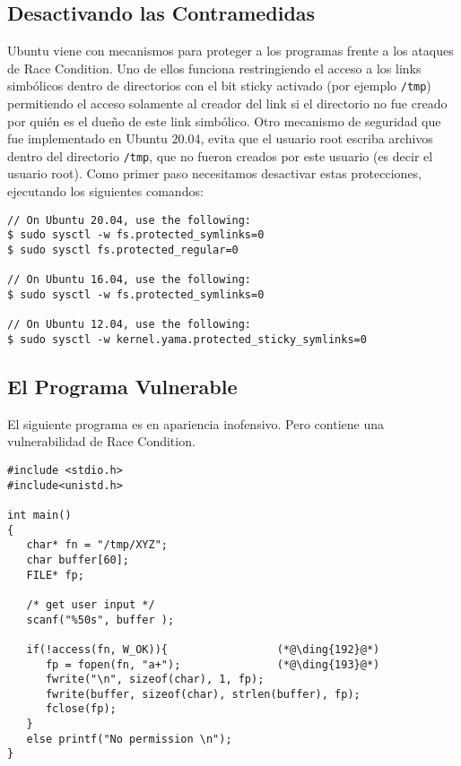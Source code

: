 \subsection{Desactivando las Contramedidas}

Ubuntu viene con mecanismos para proteger a los programas frente a los ataques de Race Condition. Uno de ellos funciona restringiendo el acceso a los links simbólicos dentro de  directorios con el bit sticky activado (por ejemplo {\tt /tmp}) permitiendo el acceso solamente al creador del link si el directorio no fue creado por quién es el dueño de este link simbólico.
Otro mecanismo de seguridad que fue implementado en Ubuntu 20.04, evita que el usuario root escriba archivos dentro del directorio \texttt{/tmp}, que no fueron creados por este usuario (es decir el usuario root).
Como primer paso necesitamos desactivar estas protecciones, ejecutando los siguientes comandos:

\begin{lstlisting}
// On Ubuntu 20.04, use the following:
$ sudo sysctl -w fs.protected_symlinks=0
$ sudo sysctl fs.protected_regular=0

// On Ubuntu 16.04, use the following:
$ sudo sysctl -w fs.protected_symlinks=0

// On Ubuntu 12.04, use the following:
$ sudo sysctl -w kernel.yama.protected_sticky_symlinks=0
\end{lstlisting}


\subsection{El Programa Vulnerable}

El siguiente programa es en apariencia inofensivo. Pero contiene una vulnerabilidad de Race Condition.

\begin{lstlisting}[caption={The vulnerable program (\texttt{vulp.c})}]
#include <stdio.h>
#include<unistd.h>

int main()
{
   char* fn = "/tmp/XYZ";
   char buffer[60];
   FILE* fp;

   /* get user input */
   scanf("%50s", buffer );

   if(!access(fn, W_OK)){                 (*@\ding{192}@*)
      fp = fopen(fn, "a+");               (*@\ding{193}@*)
      fwrite("\n", sizeof(char), 1, fp);
      fwrite(buffer, sizeof(char), strlen(buffer), fp);
      fclose(fp);
   }
   else printf("No permission \n");
}
\end{lstlisting}

